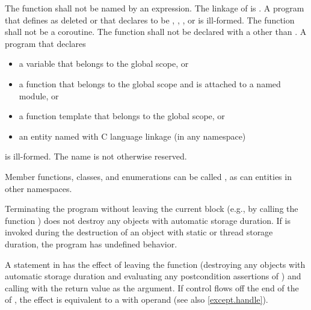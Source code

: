 \pnum
The function  shall not be named by an expression.
%
The linkage of  is
. A program that defines  as
deleted or that declares  to be
, , , or  is ill-formed.
The function  shall not be a coroutine.
The  function shall not be declared with a
 other than .
A program that declares
\begin{itemize}
\item
a variable  that belongs to the global scope, or
\item
a function  that belongs to the global scope and
is attached to a named module, or
\item
a function template  that belongs to the global scope, or
\item
an entity named 
with C language linkage (in any namespace)
\end{itemize}
is ill-formed.
The name  is
not otherwise reserved.
\begin{example}
Member functions, classes, and
enumerations can be called , as can entities in other
namespaces.
\end{example}

\pnum
{}%
%
%
Terminating the program
without leaving the current block (e.g., by calling the function
) does not destroy any
objects with automatic storage duration. If
 is invoked during the destruction of
an object with static or thread storage duration, the program has undefined
behavior.

\pnum
{}%
%
A  statement in  has the effect of leaving the 
function (destroying any objects with automatic storage duration
and evaluating any postcondition assertions of )
and calling  with the return value as the argument.
If control flows off the end of
the  of ,
the effect is equivalent to a  with operand 
(see also \ref{except.handle}).

